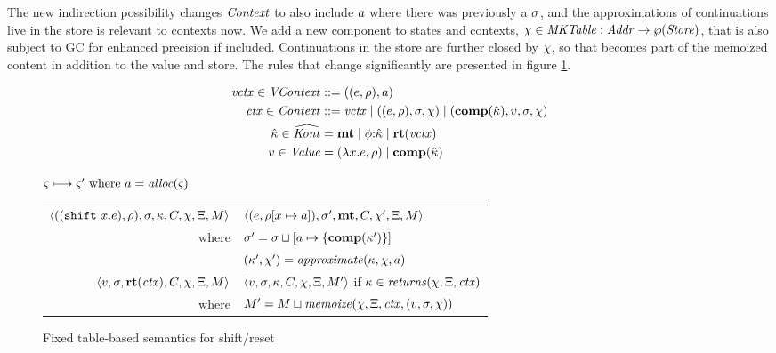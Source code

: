 The new indirection possibility changes $\mathit{Context}$ to also include $a$ where there was previously a $\sigma$, and the approximations of continuations live in the store is relevant to contexts now.
%
We add a new component to states and contexts, $\chi \in \mathit{MKTable} : \mathit{Addr} \to \wp(\mathit{Store})$, that is also subject to GC for enhanced precision if included.
%
Continuations in the store are further closed by $\chi$, so that becomes part of the memoized content in addition to the value and store.
%
The rules that change significantly are presented in figure \ref{fig:shift-reset-table1}.

{
\setlength{\abovedisplayskip}{0pt}
\setlength{\belowdisplayskip}{4pt}
\setlength{\abovedisplayshortskip}{0pt}
\setlength{\belowdisplayshortskip}{8pt}
\begin{align*}
  \mathit{vctx} \in \mathit{VContext} &::= ((e,\rho),a) \\
  \mathit{ctx} \in \mathit{Context} &::= \mathit{vctx} \mathrel{\mid} ((e,\rho),\sigma,\chi) \mathrel{\mid} (\mathbf{comp}(\hat{\kappa}), v, \sigma, \chi) \\
  \hat{\kappa} \in \widehat{\mathit{Kont}} &= \mathbf{mt} \mathrel{\mid} \phi{\tt :} \hat{\kappa} \mathrel{\mid} \mathbf{rt}(\mathit{vctx}) \\
  v \in \mathit{Value} &= (\lambda{} x. e, \rho) \mathrel{\mid} \mathbf{comp}(\hat{\kappa})
  \end{align*}
}

\begin{figure}
  \centering
  $\varsigma \longmapsto \varsigma' \text{ where } a = \mathit{alloc}(\varsigma)$ \\
  \begin{tabular}{r|l}
    \hline
    $\langle ((\texttt{shift}\ x. e), \rho), \sigma, \kappa, C, \chi, \Xi, M \rangle$
    &
    $\langle (e, \rho[x \mapsto a]), \sigma',\mathbf{mt},C, \chi', \Xi,M \rangle$
    \\
    where & $\sigma' = \sigma\sqcup[a \mapsto \{ \mathbf{comp}(\kappa') \}]$ \\
    & $(\kappa',\chi') = \mathit{approximate}(\kappa, \chi, a)$
\\
   $\langle v, \sigma, \mathbf{rt}(\mathit{ctx}), C, \chi, \Xi, M \rangle$
   &
   $\langle v, \sigma, \kappa, C, \chi, \Xi, M' \rangle$
   if $\kappa \in \mathit{returns}(\chi, \Xi, \mathit{ctx})$
   \\
   where & $M' = M \sqcup \mathit{memoize}(\chi, \Xi, \mathit{ctx}, (v, \sigma, \chi))$
  \end{tabular}
  \caption{Fixed table-based semantics for shift/reset}
  \label{fig:shift-reset-table1}
\end{figure}

